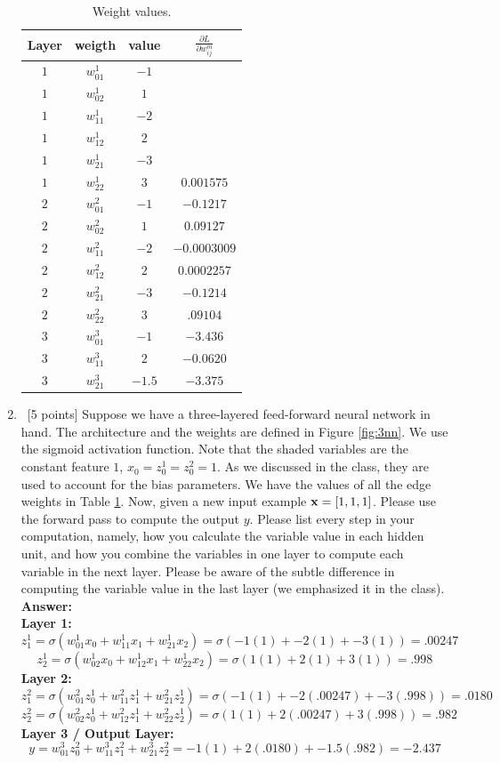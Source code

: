 \documentclass[12pt, fullpage,letterpaper]{article}
\newcommand{\Answer}{{\\\textbf{Answer: }}}
\newcommand{\pd}[2]{\frac{\partial #1}{\partial #2}}
\begin{document}
\begin{enumerate}
	\begin{table}[h]
		\centering
		\begin{tabular}{c|ccc}
			Layer & weigth  & value & $\pd{L}{w^m_{ij}}$\\ 
			\hline\hline
			$1$ & $w_{01}^1$ & $-1$  \\ \hline
			$1$ & $w_{02}^1$ & $1$ \\ \hline
			$1$ & $w_{11}^1$ & $-2$ \\ \hline
			$1$ & $w_{12}^1$ & $2$ \\ \hline
			$1$ & $w_{21}^1$ & $-3$ \\ \hline
			$1$ & $w_{22}^1$ & $3$ & $0.001575$ \\ \hline
			$2$ & $w_{01}^2$ & $-1$ & $-0.1217$ \\ \hline
			$2$ & $w_{02}^2$ & $1$ & $0.09127$ \\ \hline
			$2$ & $w_{11}^2$ & $-2$ & $-0.0003009$ \\ \hline
			$2$ & $w_{12}^2$ & $2$ & $0.0002257$ \\ \hline
			$2$ & $w_{21}^2$ & $-3$ & $-0.1214$\\ \hline
			$2$ & $w_{22}^2$ & $3$ & $.09104$ \\ \hline
			$3$ & $w_{01}^3$ & $-1$ & $-3.436$ \\ \hline
			$3$ & $w_{11}^3$ & $2$ & $-0.0620$ \\ \hline
			$3$ & $w_{21}^3$ & $-1.5$ & $-3.375$  \\ \hline
		\end{tabular}
		\caption{Weight values.}
		\label{tb:w}
	\end{table}
	
	\item~[5 points] Suppose we have a three-layered feed-forward neural network in hand. The architecture and the weights are defined in Figure \ref{fig:3nn}. We use the sigmoid activation function. Note that the shaded variables are the constant feature $1$, \ie $x_0 = z_{0}^1 = z_{0}^2 = 1$. As we discussed in the class, they are used to account for the bias parameters. 
	We have the values of all the edge weights in Table \ref{tb:w}. Now, given a new input example ${\bf x}=[1, 1, 1]$. Please use the forward pass to compute the output $y$. Please list every step in your computation, namely, how you calculate the variable value in each hidden unit, and how  you combine the variables in one layer to compute each variable in the next layer. Please be aware of the subtle difference in computing the variable value in the last layer (we emphasized it in the class). 
	\Answer \\
	\textbf{Layer 1:}
    \[z^1_1 = \sigma(w^1_{01}x_0 + w^1_{11}x_1 + w^1_{21}x_2) = \sigma(-1(1) + -2(1) + -3(1)) = .00247\]
	\[z^1_2 = \sigma(w^1_{02}x_0 + w^1_{12}x_1 + w^1_{22}x_2) = \sigma(1(1) + 2(1) + 3(1)) = .998\]
	\textbf{Layer 2:}
	\[z^2_1 = \sigma(w^2_{01}z^1_0 + w^2_{11}z^1_1 + w^2_{21}z^1_2) = \sigma(-1(1) + -2(.00247) + -3(.998)) = .0180\]
	\[z^2_2 = \sigma(w^2_{02}z^1_0 + w^2_{12}z^1_1 + w^2_{22}z^1_2) = \sigma(1(1) + 2(.00247) + 3(.998)) = .982\]
	\textbf{Layer 3 / Output Layer:}
	\[y = w^3_{01}z^2_0 + w^3_{11}z^2_1 + w^3_{21}z^2_2 = -1(1) + 2(.0180) + -1.5(.982) = -2.437\]
	

\end{enumerate}
\end{document}
